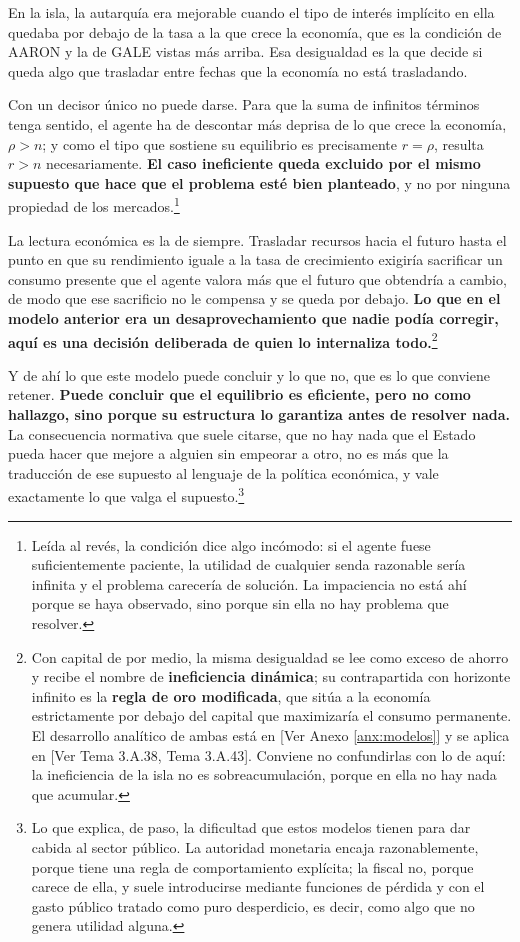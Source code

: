 \documentclass[10pt,a4paper]{article}
\newcommand{\authorfont}[1]{{\fontfamily{EBGaramond-TLF}\selectfont #1}}
\begin{document}
En la isla, la autarquía era mejorable cuando el tipo de interés implícito en ella quedaba por debajo de la tasa a la que crece la economía, que es la condición de AARON y la de GALE vistas más arriba. Esa desigualdad es la que decide si queda algo que trasladar entre fechas que la economía no está trasladando.

Con un decisor único no puede darse. Para que la suma de infinitos términos tenga sentido, el agente ha de descontar más deprisa de lo que crece la economía, $\rho>n$; y como el tipo que sostiene su equilibrio es precisamente $r=\rho$, resulta $r>n$ necesariamente. \textbf{El caso ineficiente queda excluido por el mismo supuesto que hace que el problema esté bien planteado}, y no por ninguna propiedad de los mercados.\footnote{%
    Leída al revés, la condición dice algo incómodo: si el agente fuese suficientemente paciente, la utilidad de cualquier senda razonable sería infinita y el problema carecería de solución. La impaciencia no está ahí porque se haya observado, sino porque sin ella no hay problema que resolver.
}

La lectura económica es la de siempre. Trasladar recursos hacia el futuro hasta el punto en que su rendimiento iguale a la tasa de crecimiento exigiría sacrificar un consumo presente que el agente valora más que el futuro que obtendría a cambio, de modo que ese sacrificio no le compensa y se queda por debajo. \textbf{Lo que en el modelo anterior era un desaprovechamiento que nadie podía corregir, aquí es una decisión deliberada de quien lo internaliza todo.}\footnote{%
    Con capital de por medio, la misma desigualdad se lee como exceso de ahorro y recibe el nombre de \textbf{ineficiencia dinámica}; su contrapartida con horizonte infinito es la \textbf{regla de oro modificada}, que sitúa a la economía estrictamente por debajo del capital que maximizaría el consumo permanente. El desarrollo analítico de ambas está en [\authorfont{Ver Anexo \ref{anx:modelos}}] y se aplica en [\authorfont{Ver Tema 3.A.38, Tema 3.A.43}]. Conviene no confundirlas con lo de aquí: la ineficiencia de la isla no es sobreacumulación, porque en ella no hay nada que acumular.
}

Y de ahí lo que este modelo puede concluir y lo que no, que es lo que conviene retener. \textbf{Puede concluir que el equilibrio es eficiente, pero no como hallazgo, sino porque su estructura lo garantiza antes de resolver nada.} La consecuencia normativa que suele citarse, que no hay nada que el Estado pueda hacer que mejore a alguien sin empeorar a otro, no es más que la traducción de ese supuesto al lenguaje de la política económica, y vale exactamente lo que valga el supuesto.\footnote{%
    Lo que explica, de paso, la dificultad que estos modelos tienen para dar cabida al sector público. La autoridad monetaria encaja razonablemente, porque tiene una regla de comportamiento explícita; la fiscal no, porque carece de ella, y suele introducirse mediante funciones de pérdida y con el gasto público tratado como puro desperdicio, es decir, como algo que no genera utilidad alguna.
}
\end{document}
